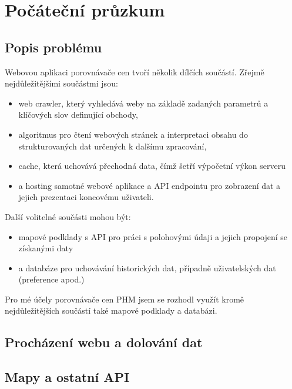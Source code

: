 \chapter{Počáteční průzkum}
\section{Popis problému}

Webovou aplikaci porovnávače cen tvoří několik dílčích součástí.
Zřejmě nejdůležitějšími součástmi jsou:
\begin{itemize}
    \item web crawler, který vyhledává
        weby na základě zadaných parametrů a klíčových slov
        definující obchody,
    \item algoritmus pro čtení webových stránek a interpretaci
        obsahu do strukturovaných dat určených k dalšímu zpracování,
    \item cache, která uchovává přechodná data, čímž šetří výpočetní
        výkon serveru
    \item a hosting samotné webové aplikace a API endpointu
        pro zobrazení dat a jejich prezentaci koncovému uživateli.
\end{itemize}

Další volitelné součásti mohou být:
\begin{itemize}
    \item mapové podklady s API pro práci s polohovými údaji
        a jejich propojení se získanými daty
    \item a databáze pro uchovávání historických dat, případně
        uživatelských dat (preference apod.)
\end{itemize}

Pro mé účely porovnávače cen PHM jsem se rozhodl využít kromě
nejdůležitějších součástí také mapové podklady a databázi.

\section{Procházení webu a dolování dat}

\section{Mapy a ostatní API}

\endinput
